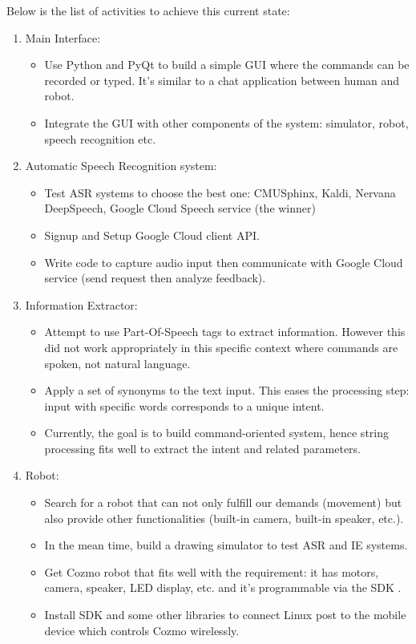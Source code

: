Below is the list of activities to achieve this current state:
\begin{enumerate}
	\item Main Interface:
	\begin{itemize}
		\item Use Python and PyQt to build a simple GUI where the commands can be recorded or typed. It's similar to a chat application between human and robot.
		\item Integrate the GUI with other components of the system: simulator, robot, speech recognition etc.		
	\end{itemize}
	\item Automatic Speech Recognition system:
	\begin{itemize}
		\item Test ASR systems to choose the best one: CMUSphinx, Kaldi, Nervana DeepSpeech, Google Cloud Speech service (the winner)
		\item Signup and Setup Google Cloud client API.
		\item Write code to capture audio input then communicate with Google Cloud service (send request then analyze feedback).		
	\end{itemize}
	\item Information Extractor:
	\begin{itemize}
		\item Attempt to use Part-Of-Speech tags to extract information. However this did not work appropriately in this specific context where commands are spoken, not natural language. 
		\item Apply a set of synonyms to the text input. This eases the processing step: input with specific words corresponds to a unique intent.
		\item Currently, the goal is to build command-oriented system, hence string processing fits well to extract the intent and related parameters.
	\end{itemize}
	\item Robot:
	\begin{itemize}
		\item Search for a robot that can not only fulfill our demands (movement) but also provide other functionalities (built-in camera, built-in speaker, etc.).
		\item In the mean time, build a drawing simulator to test ASR and IE systems.
		\item Get Cozmo robot that fits well with the requirement: it has motors, camera, speaker, LED display, etc. and it's programmable via the SDK \cite{ANKI:2017}.
		\item Install SDK and some other libraries to connect Linux post to the mobile device which controls Cozmo wirelessly.
	\end{itemize}
\end{enumerate}

